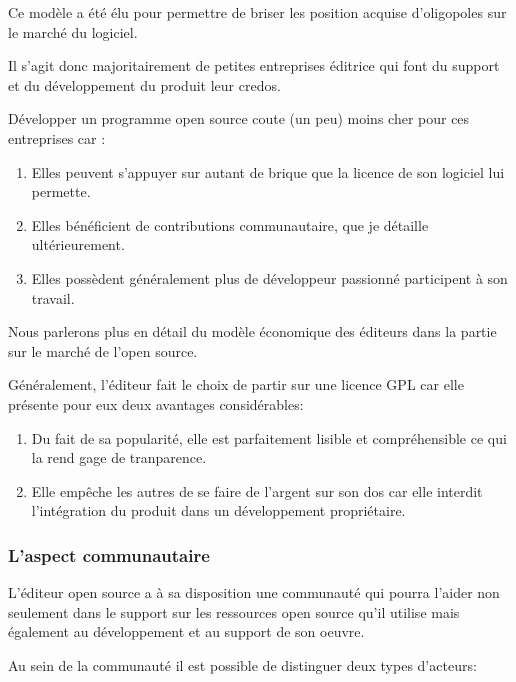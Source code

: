 			Ce modèle a été élu pour permettre de briser les position acquise d'oligopoles sur le marché du logiciel.

			Il s'agit donc majoritairement de petites entreprises éditrice qui font du support et du développement du produit leur credos.

			Développer un programme open source coute (un peu) moins cher pour ces entreprises car :

			\begin{enumerate}[font=\color{burntorange}]

		 		\item Elles peuvent s'appuyer sur autant de brique que la licence de son logiciel lui permette.
		 		\item Elles bénéficient de contributions communautaire, que je détaille ultérieurement.
			 	\item Elles possèdent généralement plus de développeur passionné participent à son travail.

			\end{enumerate}

			Nous parlerons plus en détail du modèle économique des éditeurs dans la partie sur le marché de l'open source.

			Généralement, l'éditeur fait le choix de partir sur une licence GPL car elle présente pour eux deux avantages considérables:


			\begin{enumerate}[font=\color{burntorange}]

		 		\item Du fait de sa popularité, elle est parfaitement lisible et compréhensible ce qui la rend gage de tranparence.
		 		\item Elle empêche les autres de se faire de l'argent sur son dos car elle interdit l'intégration du produit dans un développement propriétaire.

			\end{enumerate}

			\subsubsection{L'aspect communautaire}

			L'éditeur open source a à sa disposition une communauté qui pourra l'aider non seulement dans le support sur les ressources open source qu'il utilise mais également au développement et au support de son oeuvre.

			Au sein de la communauté il est possible de distinguer deux types d'acteurs:

